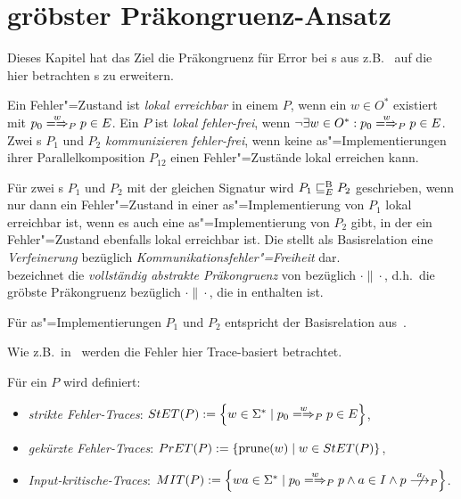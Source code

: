 \section{gröbster Präkongruenz-Ansatz}

Dieses Kapitel hat das Ziel die Präkongruenz für Error bei \EIO{}s aus
z.B.~\cite{Schinko2016BA} auf die hier betrachten \MEIO{}s zu erweitern.

\begin{Def}
  Ein Fehler"=Zustand ist \emph{lokal erreichbar} in einem \MEIO{} $P$, wenn
  ein $w\in O^*$ existiert mit $p_0 \weakmay[w]_P p\in E$. Ein \MEIO{} $P$
  ist \emph{lokal fehler-frei}, wenn $\neg\exists w\in O^*: p_0\weakmay[w]_P
  p\in E$.\\
  Zwei \MEIO{}s $P_1$ und $P_2$ \emph{kommunizieren fehler-frei}, wenn keine
  as"=Implementierungen ihrer Parallelkomposition $P_{12}$ einen
  Fehler"=Zustände lokal erreichen kann.
\end{Def}

\vspace{0.2cm}

\begin{Def}
  \label{EBRelDef}
  Für zwei \MEIO{}s $P_1$ und $P_2$ mit der gleichen Signatur wird $P_1 \sqsubseteq  _E^\mathrm{B}{}
  P_2$ geschrieben, wenn nur dann ein Fehler"=Zustand in einer
  as"=Implementierung von $P_1$ lokal erreichbar ist, wenn es auch eine
  as"=Implementierung von $P_2$ gibt, in der ein Fehler"=Zustand ebenfalls
  lokal erreichbar ist. Die \EBRel{} stellt als Basisrelation eine
  \emph{Verfeinerung} bezüglich \emph{Kommunikationsfehler"=Freiheit} dar.\\
  \ECRel{} bezeichnet die \emph{vollständig abstrakte Präkongruenz} von
  \EBRel{} bezüglich $\cdot\|\cdot$, d.h.\ die gröbste Präkongruenz bezüglich
  $\cdot\|\cdot$, die in \EBRel{} enthalten ist.
\end{Def}

Für as"=Implementierungen $P_1$ und $P_2$ entspricht \EBRel{} der Basisrelation
\EBbaRel{} aus~\cite{Schinko2016BA}.

Wie z.B.\ in~\cite{Schinko2016BA} werden die Fehler hier Trace-basiert
betrachtet.

\begin{Def}
  \label{KommTracesDef}
  Für ein \MEIO{} $P$ wird definiert:
  \begin{itemize}
    \item \emph{strikte Fehler-Traces}: $\StET (P) :=
      \left\{w\in\Sigma ^* \mid p_0 \weakmay[w]_P p \in E\right\}$,
    \item \emph{gekürzte Fehler-Traces}: $PrET (P) :=
      \left\{\mathrm{prune} (w) \mid w\in StET (P)\right\}$,
    \item \emph{Input-kritische-Traces}: $\MIT (P) := \left\{wa\in\Sigma ^*
      \mid p_0 \weakmay[w]_P p \land a\in I\land p\nmust[a]_P \right\}$.
  \end{itemize}
\end{Def}

